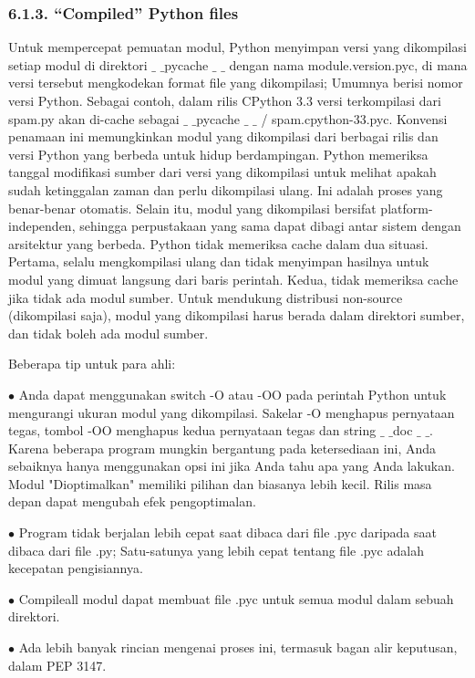 \documentclass[a4paper,12pt]{report}
\begin{document}
\subsubsection*{6.1.3. “Compiled” Python files}
 \par
\noindent 
Untuk mempercepat pemuatan modul, Python menyimpan versi yang dikompilasi setiap modul di direktori  $  \_  $ $  \_  $pycache $  \_  $ $  \_  $ dengan nama module.version.pyc, di mana versi tersebut mengkodekan format file yang dikompilasi; Umumnya berisi nomor versi Python. Sebagai contoh, dalam rilis CPython 3.3 versi terkompilasi dari spam.py akan di-cache sebagai  $  \_  $ $  \_  $pycache  $  \_  $ $  \_  $ / spam.cpython-33.pyc. Konvensi penamaan ini memungkinkan modul yang dikompilasi dari berbagai rilis dan versi Python yang berbeda untuk hidup berdampingan. Python memeriksa tanggal modifikasi sumber dari versi yang dikompilasi untuk melihat apakah sudah ketinggalan zaman dan perlu dikompilasi ulang. Ini adalah proses yang benar-benar otomatis. Selain itu, modul yang dikompilasi bersifat platform-independen, sehingga perpustakaan yang sama dapat dibagi antar sistem dengan arsitektur yang berbeda. Python tidak memeriksa cache dalam dua situasi. Pertama, selalu mengkompilasi ulang dan tidak menyimpan hasilnya untuk modul yang dimuat langsung dari baris perintah. Kedua, tidak memeriksa cache jika tidak ada modul sumber. Untuk mendukung distribusi non-source (dikompilasi saja), modul yang dikompilasi harus berada dalam direktori sumber, dan tidak boleh ada modul sumber. \par
\noindent 
Beberapa tip untuk para ahli: \par
\noindent 
 $ \bullet $ Anda dapat menggunakan switch -O atau -OO pada perintah Python untuk mengurangi ukuran modul yang dikompilasi. Sakelar -O menghapus pernyataan tegas, tombol -OO menghapus kedua pernyataan tegas dan string  $  \_  $ $  \_  $doc $  \_  $ $  \_  $. Karena beberapa program mungkin bergantung pada ketersediaan ini, Anda sebaiknya hanya menggunakan opsi ini jika Anda tahu apa yang Anda lakukan. Modul "Dioptimalkan" memiliki pilihan dan biasanya lebih kecil. Rilis masa depan dapat mengubah efek pengoptimalan. \par
\noindent 
 $ \bullet $ Program tidak berjalan lebih cepat saat dibaca dari file .pyc daripada saat dibaca dari file .py; Satu-satunya yang lebih cepat tentang file .pyc adalah kecepatan pengisiannya. \par
\noindent 
 $ \bullet $ Compileall modul dapat membuat file .pyc untuk semua modul dalam sebuah direktori. \par
\noindent 
 $ \bullet $ Ada lebih banyak rincian mengenai proses ini, termasuk bagan alir keputusan, dalam PEP 3147. \par
\end{document}
